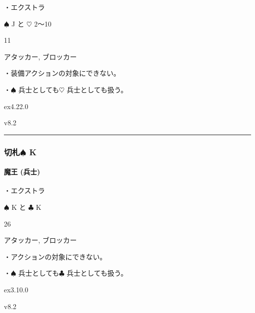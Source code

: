 \documentclass[letterpaper,10pt,dvipdfmx]{sphinxmanual}
\begin{document}
\sphinxAtStartPar
・エクストラ

\sphinxAtStartPar
{} {\normalsize $\spadesuit$} J と {\normalsize $\heartsuit$} 2〜10

\sphinxAtStartPar
{} 11

\sphinxAtStartPar
{} アタッカー, ブロッカー

\sphinxAtStartPar
{}

\sphinxAtStartPar
・装備アクションの対象にできない。

\sphinxAtStartPar
・{\normalsize $\spadesuit$} 兵士としても{\normalsize $\heartsuit$} 兵士としても扱う。

\sphinxAtStartPar
{}  ex4.22.0

\sphinxAtStartPar
{}  v8.2


\bigskip\hrule\bigskip



\subsubsection{切札{\normalsize $\spadesuit$} K}
\label{\detokenize{auto/frameActionlist:id89}}

\paragraph{魔王 (兵士)}
\label{\detokenize{auto/frameActionlist:char-darklord}}\label{\detokenize{auto/frameActionlist:id90}}
\sphinxAtStartPar
{}

\sphinxAtStartPar
・エクストラ

\sphinxAtStartPar
{} {\normalsize $\spadesuit$} K と {\normalsize $\clubsuit$} K

\sphinxAtStartPar
{} 26

\sphinxAtStartPar
{} アタッカー, ブロッカー

\sphinxAtStartPar
{}

\sphinxAtStartPar
・アクションの対象にできない。

\sphinxAtStartPar
・{\normalsize $\spadesuit$} 兵士としても{\normalsize $\clubsuit$} 兵士としても扱う。

\sphinxAtStartPar
{}  ex3.10.0

\sphinxAtStartPar
{}  v8.2
\end{document}
